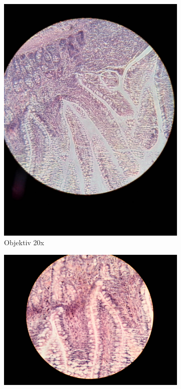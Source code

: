 \begin{figure}[h!]
	\begin{subfigure}[b]{0.3\textwidth}
		\includegraphics[width=1\textwidth]{../images/04_mammal_illeum.jpg}
		\caption{Objektiv 20x}
	\end{subfigure}
	\begin{subfigure}[b]{0.3\textwidth}
		\includegraphics[angle=270, width=1\textwidth]{../images/05_mammal_illeum.jpg}

\end{subfigure}
\end{figure}
